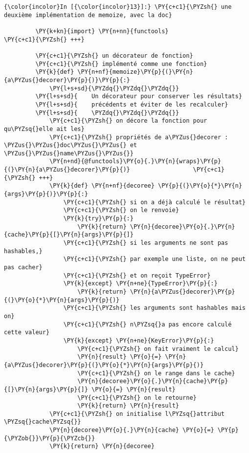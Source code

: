     \begin{Verbatim}[commandchars=\\\{\}]
{\color{incolor}In [{\color{incolor}13}]:} \PY{c+c1}{\PYZsh{} une deuxième implémentation de memoize, avec la doc}
         
         \PY{k+kn}{import} \PY{n+nn}{functools}                                 \PY{c+c1}{\PYZsh{} +++}
         
         \PY{c+c1}{\PYZsh{} un décorateur de fonction}
         \PY{c+c1}{\PYZsh{} implémenté comme une fonction}
         \PY{k}{def} \PY{n+nf}{memoize}\PY{p}{(}\PY{n}{a\PYZus{}decorer}\PY{p}{)}\PY{p}{:}
             \PY{l+s+sd}{\PYZdq{}\PYZdq{}\PYZdq{}}
         \PY{l+s+sd}{    Un décorateur pour conserver les résultats}
         \PY{l+s+sd}{    précédents et éviter de les recalculer}
         \PY{l+s+sd}{    \PYZdq{}\PYZdq{}\PYZdq{}}
             \PY{c+c1}{\PYZsh{} on décore la fonction pour qu\PYZsq{}elle ait les}
             \PY{c+c1}{\PYZsh{} propriétés de a\PYZus{}decorer : \PYZus{}\PYZus{}doc\PYZus{}\PYZus{} et \PYZus{}\PYZus{}name\PYZus{}\PYZus{}}
             \PY{n+nd}{@functools}\PY{o}{.}\PY{n}{wraps}\PY{p}{(}\PY{n}{a\PYZus{}decorer}\PY{p}{)}                  \PY{c+c1}{\PYZsh{} +++}
             \PY{k}{def} \PY{n+nf}{decoree} \PY{p}{(}\PY{o}{*}\PY{n}{args}\PY{p}{)}\PY{p}{:}
                 \PY{c+c1}{\PYZsh{} si on a déjà calculé le résultat}
                 \PY{c+c1}{\PYZsh{} on le renvoie}
                 \PY{k}{try}\PY{p}{:}
                     \PY{k}{return} \PY{n}{decoree}\PY{o}{.}\PY{n}{cache}\PY{p}{[}\PY{n}{args}\PY{p}{]}
                 \PY{c+c1}{\PYZsh{} si les arguments ne sont pas hashables,}
                 \PY{c+c1}{\PYZsh{} par exemple une liste, on ne peut pas cacher}
                 \PY{c+c1}{\PYZsh{} et on reçoit TypeError}
                 \PY{k}{except} \PY{n+ne}{TypeError}\PY{p}{:}
                     \PY{k}{return} \PY{n}{a\PYZus{}decorer}\PY{p}{(}\PY{o}{*}\PY{n}{args}\PY{p}{)}
                 \PY{c+c1}{\PYZsh{} les arguments sont hashables mais on}
                 \PY{c+c1}{\PYZsh{} n\PYZsq{}a pas encore calculé cette valeur}
                 \PY{k}{except} \PY{n+ne}{KeyError}\PY{p}{:}
                     \PY{c+c1}{\PYZsh{} on fait vraiment le calcul}
                     \PY{n}{result} \PY{o}{=} \PY{n}{a\PYZus{}decorer}\PY{p}{(}\PY{o}{*}\PY{n}{args}\PY{p}{)}
                     \PY{c+c1}{\PYZsh{} on le range dans le cache}
                     \PY{n}{decoree}\PY{o}{.}\PY{n}{cache}\PY{p}{[}\PY{n}{args}\PY{p}{]} \PY{o}{=} \PY{n}{result}
                     \PY{c+c1}{\PYZsh{} on le retourne}
                     \PY{k}{return} \PY{n}{result}
             \PY{c+c1}{\PYZsh{} on initialise l\PYZsq{}attribut \PYZsq{}cache\PYZsq{}}
             \PY{n}{decoree}\PY{o}{.}\PY{n}{cache} \PY{o}{=} \PY{p}{\PYZob{}}\PY{p}{\PYZcb{}}
             \PY{k}{return} \PY{n}{decoree}
\end{Verbatim}


